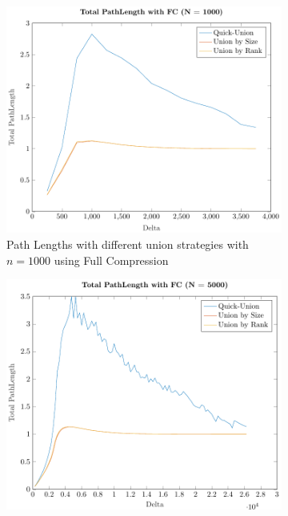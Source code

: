 \begin{figure}[ht]
    \centering
    \begin{subfigure}{0.32\textwidth}
        \centering
        \includegraphics[width=\textwidth]{../images/plotFCFull1000_PathLength.pdf}
        \caption{Path Lengths with different union strategies with $n = 1000$ using Full Compression}
    \end{subfigure}%
    \hfill
    \begin{subfigure}{0.32\textwidth}
        \centering
        \includegraphics[width=\textwidth]{../images/plotFCFull5000_PathLength.pdf}

\end{subfigure}
\end{figure}
